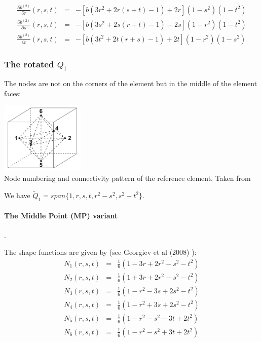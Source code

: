 \begin{eqnarray}
\frac{\partial b^{(2)}}{\partial r}(r,s,t) &=&  -[b(3r^2+2r(s+t)-1)+2r](1-s^2)(1-t^2)\\
\frac{\partial b^{(2)}}{\partial s}(r,s,t) &=&  -[b(3s^2+2s(r+t)-1)+2s](1-r^2)(1-t^2)\\
\frac{\partial b^{(2)}}{\partial t}(r,s,t) &=&  -[b(3t^2+2t(r+s)-1)+2t](1-r^2)(1-s^2)
\end{eqnarray}





\subsubsection{The rotated $Q_1$} \label{ss:rq1}

The nodes are not on the corners of the element but in the middle of the
element faces:

\begin{center}
\includegraphics[width=4cm]{images/rannacherturek/elt3D}\\
{\captionfont Node numbering and connectivity pattern of the reference element. Taken from \cite{gekm08}}
\end{center}

We have $\tilde{Q}_1=span \{1,r,s,t,r^2-s^2,s^2-t^2\}$.

\paragraph{The Middle Point (MP) variant}. 

The shape functions are given by (see Georgiev et al (2008) \cite{gekm08}):
\begin{eqnarray}
N_1(r,s,t) &=& \frac{1}{6}(1-3r+2r^2-s^2-t^2 ) \\
N_2(r,s,t) &=& \frac{1}{6}(1+3r+2r^2-s^2-t^2 ) \\
N_3(r,s,t) &=& \frac{1}{6}(1-r^2-3s+2s^2-t^2 ) \\
N_4(r,s,t) &=& \frac{1}{6}(1-r^2+3s+2s^2-t^2 ) \\
N_5(r,s,t) &=& \frac{1}{6}(1-r^2-s^2-3t+2t^2 ) \\
N_6(r,s,t) &=& \frac{1}{6}(1-r^2-s^2+3t+2t^2 ) 
\end{eqnarray}


